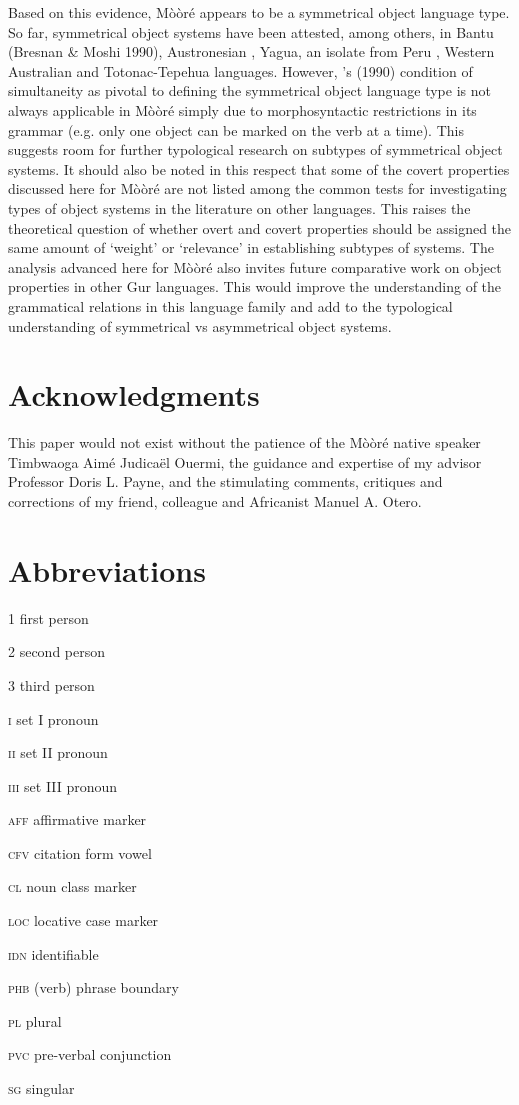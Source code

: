 \documentclass[output=paper]{langsci/langscibook}
\begin{document}
Based on this evidence, Mòòré appears to be a symmetrical object language type. So far, symmetrical object systems have been attested, among others, in Bantu (Bresnan \& Moshi 1990), Austronesian \citep{donohue1996}, Yagua, an isolate from Peru \citep{paynepayne1989}, Western Australian \citep{dench1995} and Totonac-Tepehua \citep{mckaytrechsel2008} languages. However, \citeauthor{bresnanmoshi1990}'s (1990)  condition of simultaneity as pivotal to defining the symmetrical object language type is not always applicable in Mòòré simply due to morphosyntactic restrictions in its grammar (e.g. only one object can be marked on the verb at a time). This suggests room for further typological research on subtypes of symmetrical object systems. It should also be noted in this respect that some of the covert properties discussed here for Mòòré are not listed among the common tests for investigating types of object systems in the literature on other languages. This raises the theoretical question of whether overt and covert properties should be assigned the same amount of `weight' or `relevance' in establishing subtypes of systems. The analysis advanced here for Mòòré also invites future comparative work on object properties in other Gur languages. This would improve the understanding of the grammatical relations in this language family and add to the typological understanding of symmetrical vs asymmetrical object systems.

\section*{Acknowledgments}

This paper would not exist without the patience of the Mòòré native speaker Timbwaoga Aimé Judicaël Ouermi, the guidance and expertise of my advisor Professor Doris L. Payne, and the stimulating comments, critiques and corrections of my friend, colleague and Africanist Manuel A. Otero. 

\section*{Abbreviations}


1  first person

2  second person

3  third person

\textsc{i} set I pronoun

\textsc{ii} set II pronoun

\textsc{iii} set III pronoun

\textsc{aff}  affirmative marker

\textsc{cfv}  citation form vowel

\textsc{cl} noun class marker

\textsc{loc} locative case marker

\textsc{idn} identifiable

\textsc{phb} (verb) phrase boundary

\textsc{pl} plural

\textsc{pvc} pre-verbal conjunction

\textsc{sg} singular



{\sloppy
\printbibliography[heading=subbibliography,notkeyword=this]
}
\end{document}
